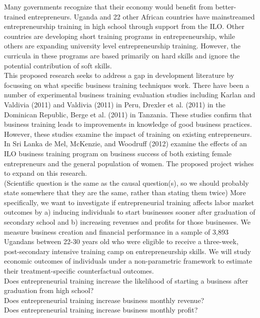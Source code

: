 Many governments recognize that their economy would benefit from better-trained entrepreneurs. Uganda and 22 other African countries have mainstreamed entrepreneurship training in high school through support from the ILO. Other countries are developing short training programs in entrepreneurship, while others are expanding university level entrepreneurship training. However, the curricula in these programs are based primarily on hard skills and ignore the potential contribution of soft skills.\\

This proposed research seeks to address a gap in development literature by focussing on what specific business training techniques work. There have been a number of experimental business training evaluation studies including Karlan and Valdivia (2011) and Valdivia (2011) in Peru, Drexler et al. (2011) in the Dominican Republic, Berge et al. (2011) in Tanzania. These studies confirm that business training leads to improvements in knowledge of good business practices. However, these studies examine the impact of training on existing entrepreneurs. In Sri Lanka de Mel, McKenzie, and Woodruff (2012) examine the effects of an ILO business training program on business success of both existing female entrepreneurs and the general population of women. The proposed project wishes to expand on this research. \\

(Scientific question is the same as the causal question(s), so we should probably state somewhere that they are the same, rather than stating them twice)
More specifically, we want to investigate if entrepreneurial training affects labor market outcomes by a) inducing individuals to start businesses sooner after graduation of secondary school and b) increasing revenues and profits for those businesses. We measure business creation and financial performance in a sample of 3,893 Ugandans between 22-30 years old who were eligible to receive a three-week, post-secondary intensive training camp on entrepreneurship skills. We will study economic outcomes of individuals under a non-parametric framework to estimate their treatment-specific counterfactual outcomes.\\

Does entrepreneurial training increase the likelihood of starting a business after graduation from high school?\\
Does entrepreneurial training increase business monthly revenue?\\
Does entrepreneurial training increase business monthly profit?\\

